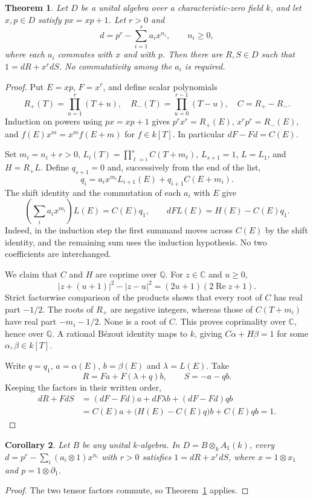 \documentclass[11pt]{article}
\theoremstyle{plain}
\newtheorem{theorem}{Theorem}[section]
\newtheorem{corollary}[theorem]{Corollary}
\theoremstyle{definition}
\theoremstyle{remark}
\theoremstyle{plain}
\begin{document}
\begin{theorem}\label{thm:evolutionary}
Let $D$ be a unital algebra over a characteristic-zero field $k$, and let
$x,p\in D$ satisfy $px=xp+1$. Let $r>0$ and
\[
 d=p^r-\sum_{i=1}^s a_i x^{n_i},\qquad n_i\ge0,
\]
where each $a_i$ commutes with $x$ and with $p$.
Then there are $R,S\in D$ such that $1=dR+x^r dS$.
No commutativity among the $a_i$ is required.
\end{theorem}
\begin{proof}
Put $E=xp$, $F=x^r$, and define scalar polynomials
\[
 R_+(T)=\prod_{u=1}^r(T+u),\quad
 R_-(T)=\prod_{u=0}^{r-1}(T-u),\quad C=R_+-R_- .
\]
Induction on powers using $px=xp+1$ gives
$p^r x^r=R_+(E)$, $x^r p^r=R_-(E)$, and
$f(E)x^m=x^m f(E+m)$ for $f\in k[T]$.
In particular $dF-Fd=C(E)$.

Set $m_i=n_i+r>0$, $L_i(T)=\prod_{\ell=i}^s C(T+m_\ell)$,
$L_{s+1}=1$, $L=L_1$, and $H=R_+L$.
Define $q_{s+1}=0$ and, successively from the end of the list,
\[
 q_i=a_i x^{m_i}L_{i+1}(E)+q_{i+1}C(E+m_i).
\]
The shift identity and the commutation of each $a_i$ with $E$ give
\[
 \left(\sum_i a_i x^{m_i}\right)L(E)=C(E)q_1,\qquad
 dF L(E)=H(E)-C(E)q_1.
\]
Indeed, in the induction step the first summand moves across $C(E)$
by the shift identity, and the remaining sum uses the induction hypothesis.
No two coefficients are interchanged.

We claim that $C$ and $H$ are coprime over $\mathbb Q$.
For $z\in\mathbb C$ and $u\ge0$,
\[
 |z+(u+1)|^2-|z-u|^2=(2u+1)(2\operatorname{Re}z+1).
\]
Strict factorwise comparison of the products shows that every root of $C$
has real part $-1/2$. The roots of $R_+$ are negative integers, whereas
those of $C(T+m_i)$ have real part $-m_i-1/2$.
None is a root of $C$. This proves coprimality over $\mathbb C$, hence over
$\mathbb Q$. A rational B\'ezout identity maps to $k$, giving
$C\alpha+H\beta=1$ for some $\alpha,\beta\in k[T]$.

Write $q=q_1$, $a=\alpha(E)$, $b=\beta(E)$ and $\lambda=L(E)$.
Take
\[
 R=Fa+F(\lambda+q)b,\qquad S=-a-qb.
\]
Keeping the factors in their written order,
\[
\begin{aligned}
 dR+FdS
  &=(dF-Fd)a+dF\lambda b+(dF-Fd)qb\\
  &=C(E)a+\bigl(H(E)-C(E)q\bigr)b+C(E)qb=1.
\end{aligned}
\]
\end{proof}

\begin{corollary}\label{cor:tensor-evolution}
Let $B$ be any unital $k$-algebra. In $D=B\otimes_k A_1(k)$, every
$d=p^r-\sum_i(a_i\otimes1)x^{n_i}$ with $r>0$ satisfies
$1=dR+x^r dS$, where $x=1\otimes x_1$ and $p=1\otimes\partial_1$.
\end{corollary}
\begin{proof}
The two tensor factors commute, so Theorem~\ref{thm:evolutionary} applies.
\end{proof}
\end{document}
